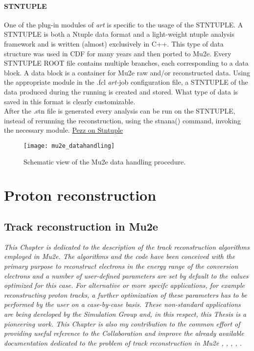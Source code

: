 \documentclass[12pt,a4paper,openright, oneside, titlepage]{book} %
\begin{document}
\subsection{STNTUPLE}
One of the plug-in modules of \textit{art} is specific to the usage of the STNTUPLE.
A STNTUPLE is both a Ntuple data format and a light-weight ntuple analysis framework and is written (almost) exclusively in C++. This type of data structure was used in CDF for many years and then ported to Mu2e. Every STNTUPLE ROOT file contains multiple branches, each corresponding to a data block. A data block is a container for Mu2e raw and/or reconstructed data. 
Using the appropriate module in the .fcl \textit{art-}job configuration file, a STNTUPLE of the data produced during the running is created and stored. What type of data is saved in this format is clearly customizable.\\
After the .stn file is generated every analysis can be run on the STNTUPLE, instead of rerunning the reconstruction, using the stnana() command, invoking the necessary module. 
\href{https://mu2e-docdb.fnal.gov/cgi-bin/private/RetrieveFile?docid=13916&filename=2017-10-20-Stntuple-YoungMu2e.pdf&version=1}{Pezz on Stntuple}

\begin{figure}[h!]
\centering
\texttt{[image: mu2e\_datahandling]}
\caption{Schematic view of the Mu2e data handling procedure.}
\label{_mu2e_datahandling}
\end{figure}


\part{Proton reconstruction}
\chapter{Track reconstruction in Mu2e}
{\itshape This Chapter is dedicated to the description of the track reconstruction algorithms employed in Mu2e. 
The algorithms and the  code have been conceived with the primary purpose 
to reconstruct electrons in the energy range of the conversion electrons 
and a number of user-defined parameters are set by default to the values optimized for this  case.
For alternative or more specifc applications, for example reconstructing proton tracks, 
a further optimization of these parameters has to be performed by the user
on a case-by-case basis.
These non-standard applications are being developed by the 
Simulation Group and, in this respect, this Thesis is a pioneering work.
This Chapter is also my contribution to the common effort of providing 
useful reference to the Collaboration and improve the
already available documentation dedicated to the problem of track reconstruction in Mu2e \cite{GianiPatRec:2016}, \cite{GianiPatRec:2020}, \cite{Brown:2014}, \cite{Kalman},  \cite{KutschkePaper}.}
\end{document}
